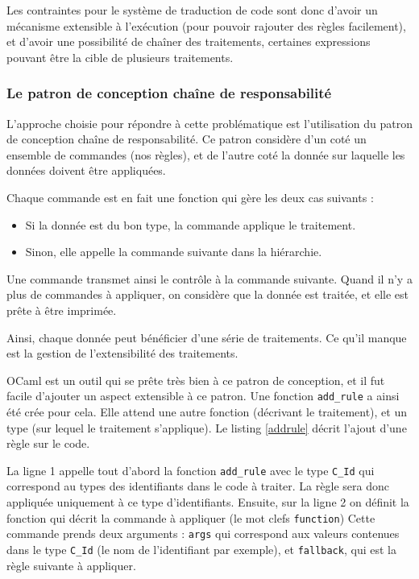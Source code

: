 \documentclass[a4paper, 11pt]{report}
\begin{document}
    Les contraintes pour le système de traduction de code sont donc d'avoir
    un mécanisme extensible à l'exécution (pour pouvoir rajouter des règles
    facilement), et d'avoir une possibilité de chaîner des traitements, certaines
    expressions pouvant être la cible de plusieurs traitements.

    \subsubsection{Le patron de conception chaîne de responsabilité}
    L'approche choisie pour répondre à cette problématique est l'utilisation
    du patron de conception chaîne de responsabilité. Ce patron considère d'un
    coté un ensemble de commandes (nos règles), et de l'autre coté la donnée sur
    laquelle les données doivent être appliquées.

    Chaque commande est en fait une fonction qui gère les deux cas suivants :
    \begin{itemize}
      \item Si la donnée est du bon type, la commande applique le traitement.
      \item Sinon, elle appelle la commande suivante dans la hiérarchie.
    \end{itemize}
    Une commande transmet ainsi le contrôle à la commande suivante.
    Quand il n'y a plus de commandes à appliquer, on considère que la donnée
    est traitée, et elle est prête à être imprimée.

    Ainsi, chaque donnée peut bénéficier d'une série de traitements. Ce qu'il
    manque est la gestion de l'extensibilité des traitements.

    OCaml est un outil qui se prête très bien à ce patron de conception, et il
    fut facile d'ajouter un aspect extensible à ce patron. Une fonction
    \texttt{add\_rule} a ainsi été crée pour cela. Elle attend une autre fonction
    (décrivant le traitement), et un type (sur lequel le traitement s'applique).
    Le listing \ref{addrule} décrit l'ajout d'une règle sur le code.

    

    La ligne 1 appelle tout d'abord la fonction \texttt{add\_rule} avec le type
    \texttt{C\_Id} qui correspond au types des identifiants dans le code à traiter.
    La règle sera donc appliquée uniquement à ce type d'identifiants. Ensuite,
    sur la ligne 2 on définit la fonction qui décrit la commande à appliquer
    (le mot clefs \texttt{function}) Cette commande prends deux arguments :
    \texttt{args} qui correspond aux valeurs contenues dans le type
    \texttt{C\_Id} (le nom de l'identifiant par exemple), et
    \texttt{fallback}, qui est la règle suivante à appliquer.
\end{document}
